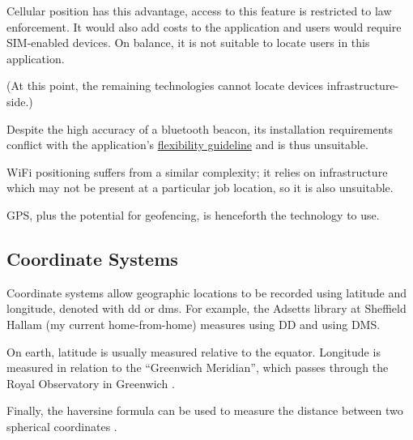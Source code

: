 Cellular position has this advantage, access to this
feature is restricted to law enforcement.
It would also add costs to the application and
\projectname{} users would require SIM-enabled devices.
On balance, it is not suitable to locate users in this
application.

(At this point, the remaining technologies cannot locate
devices infrastructure-side.)

Despite the high accuracy of a bluetooth beacon, its
installation requirements conflict with the application's
\hyperref[ss:goal]{flexibility guideline} and is thus
unsuitable.

WiFi positioning suffers from a similar complexity; it
relies on infrastructure which may not be present at a
particular job location, so it is also unsuitable.

GPS, plus the potential for geofencing, is henceforth the
technology to use.

\subsection{Coordinate Systems}
\label{ss:coordSystems}

Coordinate systems allow geographic locations to be
recorded using \gls{latitude} and \gls{longitude}, denoted
with \gls{dd} or \gls{dms}.
For example, the Adsetts library at Sheffield Hallam (my
current home-from-home) measures
 using DD and
 using DMS.

On earth, latitude is usually measured relative to the
equator.
Longitude is measured in relation to the \enquote{Greenwich
  Meridian}, which passes through the Royal Observatory in
Greenwich \parencite{coordSystems}.

Finally, the haversine formula can be used to measure the
distance between two spherical coordinates 
\parencite{haversine}.